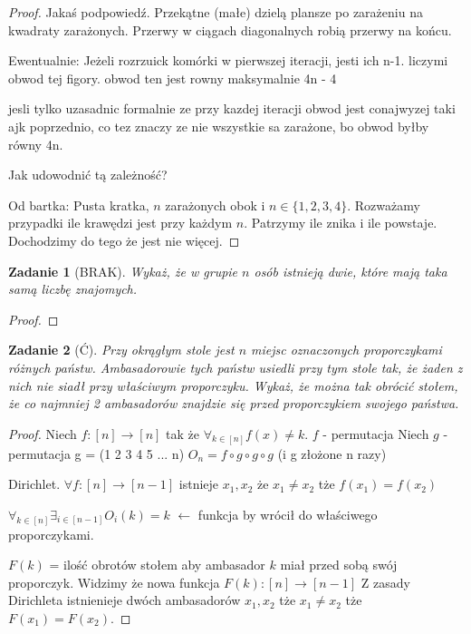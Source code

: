 \documentclass{mwbk}
\newtheorem{zad}{Zadanie}[chapter]
\begin{document}
\begin{proof}
    Jakaś podpowiedź. Przekątne (małe) dzielą plansze po zarażeniu
    na kwadraty zarażonych. Przerwy w ciągach diagonalnych robią przerwy na końcu.

    Ewentualnie:
    Jeżeli rozrzuick komórki w pierwszej iteracji, jesti ich n-1. liczymi obwod
    tej figory. obwod ten jest rowny maksymalnie 4n - 4

    jesli tylko uzasadnic formalnie ze przy kazdej iteracji obwod
    jest conajwyzej taki ajk poprzednio, co tez znaczy ze nie
    wszystkie sa zarażone, bo obwod byłby równy 4n.

    Jak udowodnić tą zależność?

    Od bartka:
    Pusta kratka, $n$ zarażonych obok i $n \in \{1, 2, 3, 4\}$.
    Rozważamy przypadki ile krawędzi jest przy każdym $n$.
    Patrzymy ile znika i ile powstaje. Dochodzimy do tego że jest
    nie więcej.
\end{proof}






\begin{zad}[BRAK]
    Wykaż, że w grupie $n$ osób istnieją dwie, które mają taka samą liczbę znajomych.
\end{zad}
\begin{proof}
\end{proof}

\begin{zad}[Ć]
    Przy okrągłym stole jest $n$ miejsc oznaczonych proporczykami różnych
    państw. Ambasadorowie tych państw usiedli przy tym stole tak, że żaden z nich nie siadł
    przy właściwym proporczyku. Wykaż, że można tak obrócić stołem, że co najmniej 2
    ambasadorów znajdzie się przed proporczykiem swojego państwa.
\end{zad}
\begin{proof}
    Niech $f:[n] \to [n]$ tak że $\forall_{k\in[n]} f(x) \neq k$.
    $f$ - permutacja
    Niech $g$ - permutacja g = (1 2 3 4 5 ... n)
    $O_n = f \circ g \circ g \circ g$ (i g złożone n razy)

    Dirichlet. $\forall f:[n] \to [n-1]$ istnieje $x_1, x_2$
    że $x_1\neq x_2$ tże $f(x_1)=f(x_2)$

    $\forall_{k \in [n]} \exists_{i \in [n-1]} O_i(k) = k$
    $\leftarrow$ funkcja by wrócił do właściwego proporczykami.

    $F(k)$ = ilość obrotów stołem aby ambasador $k$ miał
    przed sobą swój proporczyk.
    Widzimy że nowa funkcja $F(k): [n] \to [n-1]$
    Z zasady Dirichleta istnienieje dwóch ambasadorów $x_1, x_2$ tże $x_1 \neq x_2$
    tże $F(x_1) = F(x_2)$.
\end{proof}
\end{document}
